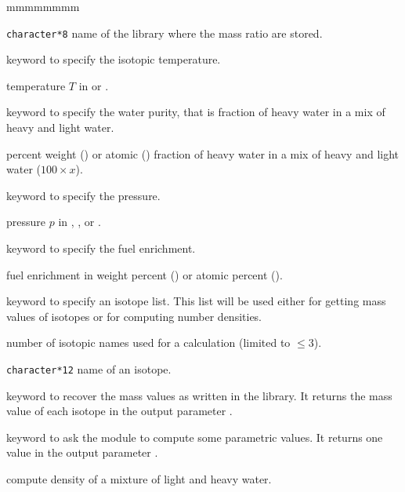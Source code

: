\begin{ListeDeDescription}{mmmmmmmm}
\item[\dusa{NAMEFIL}] \verb|character*8| name of the library where the mass ratio
are stored.

\item[\moc{TMP:}] keyword to specify the isotopic temperature.

\item[\dusa{temp}] temperature $T$ in  or .

\item[\moc{PUR:}] keyword to specify the water purity, that is fraction of heavy
water in a mix of heavy and light water.

\item[\dusa{purity}] percent weight () or atomic () fraction of heavy
water in a mix of heavy and light water ($100\times x$).

\item[\moc{PRES:}] keyword to specify the pressure.

\item[\dusa{pressure}] pressure $p$ in , ,  or .

\item[\moc{ENR:}] keyword to specify the fuel enrichment.

\item[\dusa{enrichment}] fuel enrichment in weight percent () or atomic
percent ().

\item[\moc{ISO:}] keyword to specify an isotope list. This list will be used either
for getting mass values of isotopes or for computing number  densities.

\item[\dusa{nbiso}] number of isotopic names used for a calculation (limited to
$\leq 3$).

\item[\dusa{ISONAM}] \verb|character*12| name of an isotope.

\item[\moc{GET MASS}] keyword to recover the mass values as written in the library.
It returns the mass value of each isotope in the output parameter . 

\item[\moc{CALC}] keyword to ask the module to compute some parametric values. It
returns one value in the output parameter . 

\item[\moc{DENS}] compute density of a mixture of light and heavy water.


\end{ListeDeDescription}
